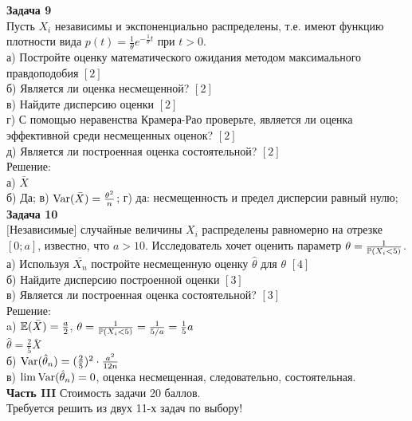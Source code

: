 \documentclass[12pt, a4paper]{article}\usepackage[]{graphicx}\usepackage[]{color}
\begin{document}
\textbf{Задача 9} \\ %
Пусть $X_{i}$ независимы и экспоненциально
распределены, т.е. имеют функцию плотности вида
$p(t)=\frac{1}{\theta}e^{-\frac{1}{\theta}t}$ при $t>0$. \\
а) Постройте оценку математического ожидания методом максимального
правдоподобия $[2]$\\
б) Является ли оценка несмещенной? $[2]$\\
в) Найдите дисперсию оценки $[2]$\\
г) С помощью неравенства Крамера-Рао проверьте, является ли
оценка эффективной среди несмещенных оценок? $[2]$\\
д) Является ли построенная оценка состоятельной? $[2]$\\
Решение: \\
а) $\bar{X}$ \\
б) Да; в) $\Var(\bar{X})=\frac{\theta^{2}}{n}$; г) да:
несмещенность и предел дисперсии равный нулю; \\

\textbf{Задача 10} \\ %
$[$Независимые$]$ случайные величины $X_{i}$ распределены
равномерно на отрезке $[0;a]$, известно, что $a>10$. Исследователь
хочет оценить
параметр $\theta=\frac{1}{\P(X_{i}<5)}$. \\
а) Используя $\bar{X_{n}}$ постройте несмещенную оценку
$\hat{\theta}$ для $\theta$ $[4]$\\
б) Найдите дисперсию построенной оценки $[3]$\\
в) Является ли построенная оценка состоятельной? $[3]$\\
Решение: \\
a) $\E(\bar{X})=\frac{a}{2}$,
$\theta=\frac{1}{\P(X_{i}<5)}=\frac{1}{5/a}=\frac{1}{5}a$ \\
$\hat{\theta}=\frac{2}{5}\bar{X}$ \\
б) $\Var(\hat{\theta}_{n})=(\frac{2}{5})^{2}\cdot\frac{a^{2}}{12n}$ \\
в) $\lim \Var(\hat{\theta}_{n})=0$, оценка несмещенная,
следовательно, состоятельная. \\

\textbf{Часть III} Стоимость задачи 20 баллов. \\

Требуется решить \textbf{} из двух 11-х задач по
выбору! \\
\end{document}
